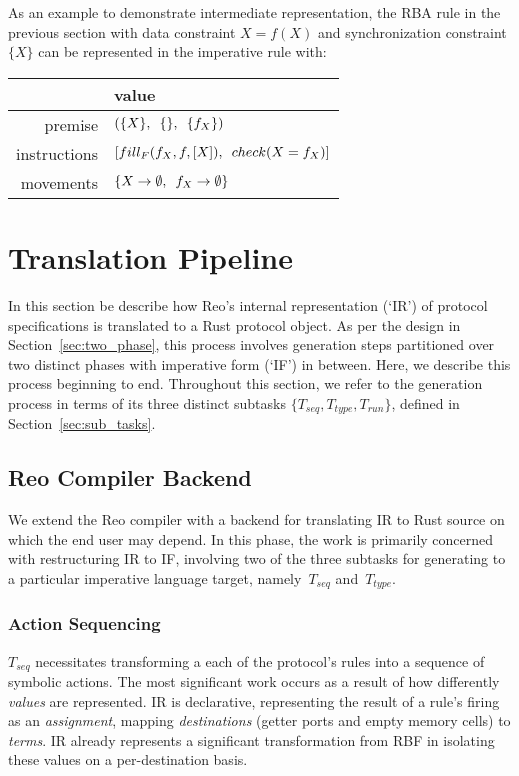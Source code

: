 As an example to demonstrate intermediate representation, the RBA rule in the previous section with data constraint $X=f(X)$
and synchronization constraint $\{X\}$ can be represented in the imperative rule with:

\vspace{1em}
\noindent{}
\begin{tabular}{r|l}
	\centering
		&  value \\ \hline
	premise	&  $(\{X\}, \enskip\{\}, \enskip\{f_X\})$ \\
	instructions	& $[fill_F(f_X, f, [X]), \enskip{} check(X = f_X)]$ \\
	movements	& $\{X \rightarrow{}\emptyset{}, \enskip f_X \rightarrow{}\emptyset{}\}$ 
\end{tabular}
\vspace{1em}

\section{Translation Pipeline}
In this section be describe how Reo's internal representation (`IR') of protocol specifications is translated to a Rust protocol object. As per the design in Section~\ref{sec:two_phase}, this process involves generation steps partitioned over two distinct phases with imperative form (`IF') in between. Here, we describe this process beginning to end. Throughout this section, we refer to the generation process in terms of its three distinct subtasks $\{T_{seq}, T_{type}, T_{run}\}$, defined in Section~\ref{sec:sub_tasks}.

\subsection{Reo Compiler Backend}
\label{sec:translation_phase_1}
We extend the Reo compiler with a backend for translating IR to Rust source on which the end user may depend. In this phase, the work is primarily concerned with restructuring IR to IF, involving two of the three subtasks for generating to a particular imperative language target, namely~$T_{seq}$ and~$T_{type}$. 

\subsubsection{Action Sequencing}
$T_{seq}$ necessitates transforming a each of the protocol's rules into a sequence of symbolic actions. The most significant work occurs as a result of how differently \textit{values} are represented. IR is declarative, representing the result of a rule's firing as an \textit{assignment}, mapping \textit{destinations} (getter ports and empty memory cells) to \textit{terms}. IR already represents a significant transformation from RBF in isolating these values on a per-destination basis. 

